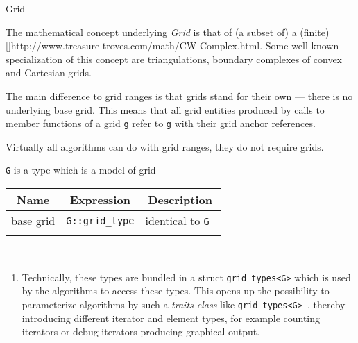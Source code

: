 \begin{Label}{Grid}
\end{Label}

The  mathematical concept underlying {\em  Grid }    
is that of (a subset of) a (finite)     
[\cite{weingram}]{http://www.treasure-troves.com/math/CW-Complex.html}. 
Some well-known specialization of this concept are    
triangulations, boundary complexes of convex  
and Cartesian grids.     


The main difference to grid ranges is that grids stand for their own ---
there is no underlying base grid. 
This means that all grid entities produced by calls to member functions of a grid      
{\tt  g} refer to {\tt  g} with their grid anchor references.    

Virtually all algorithms can do with grid ranges, they do not require grids.    

{\tt  G} is a type which is a model of grid      

    
\begin{tabular}{ccc} \\ 
  \hline
  {\bf  Name  } & {\bf  Expression  } & {\bf  Description  } \\ 
  \hline 
  base grid  & {\tt  G::grid\_type}  & identical to {\tt  G }  \\ 
  \hline
  \\
\end{tabular}


\\

 \begin{enumerate}
   \item Technically, these types are bundled in a struct 
     {\tt  grid\_types<G>}      
     which is used by the algorithms to access these types. 
     This opens up the possibility  to parameterize algorithms by such a {\em  traits class } 
     like {\tt  grid\_types<G> },      
     thereby introducing different iterator and element types, 
     for example counting iterators or debug iterators producing graphical output.    
\end{enumerate}

 ~
 ~ 
